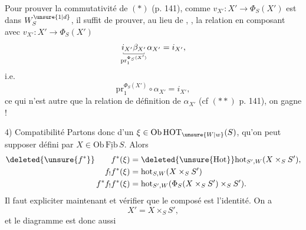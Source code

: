 Pour prouver la commutativité de $(*)$ (p. 141), comme $v_{X'}:X'\longrightarrow\Phi_S(X')$ est dans $W_S^{\unsure{1|d}}$, il suffit de prouver, au lieu de , , la relation  en composant avec $v_{X'}:X'\longrightarrow\Phi_S(X')$
\[
 \underset{\substack{\rule{.35pt}{.4ex}\rule{2.5em}{.35pt}\rule{.35pt}{.4ex}\\\mathrm{pr}_1^{\Phi_S(X')}}}{i_{X'}\beta_{X'}}\alpha_{X'}=i_{X'},
\]
i.e.
\[
 \mathrm{pr}_1^{\Phi_S(X')}\circ\alpha_{X'}=i_{X'},
\]
ce qui n'est autre que la relation de définition de $\alpha_{X'}$ (cf $(**)$ p. 141), on gagne !

4) Compatibilité
Partons donc d'un $\xi\in\mathrm{Ob}\,\mathrm{HOT}_{\unsure{W|w}}(S)$, qu'on peut supposer défini par $X\in\mathrm{Ob}\,\underline{\mathrm{Fib}}\,S$. Alors
\[
 \begin{aligned}
 \deleted{\unsure{f^*}}\qquad f^*(\xi)&=\deleted{\unsure{\mathrm{Hot}}}\mathrm{hot}_{S',W}(X\times_S S'),\\
 f_!f^*(\xi)&=\mathrm{hot}_{S,W}(X\times_S S')\\
 f^*f_!f^*(\xi)&=\mathrm{hot}_{S',W}(\Phi_S(X\times_S S')\times_S S').
 \end{aligned}
\]
Il faut expliciter maintenant
et vérifier que le composé est l'identité.  On a 
\[
 X'=X\times_S S',
\]
 et  le diagramme est donc aussi
